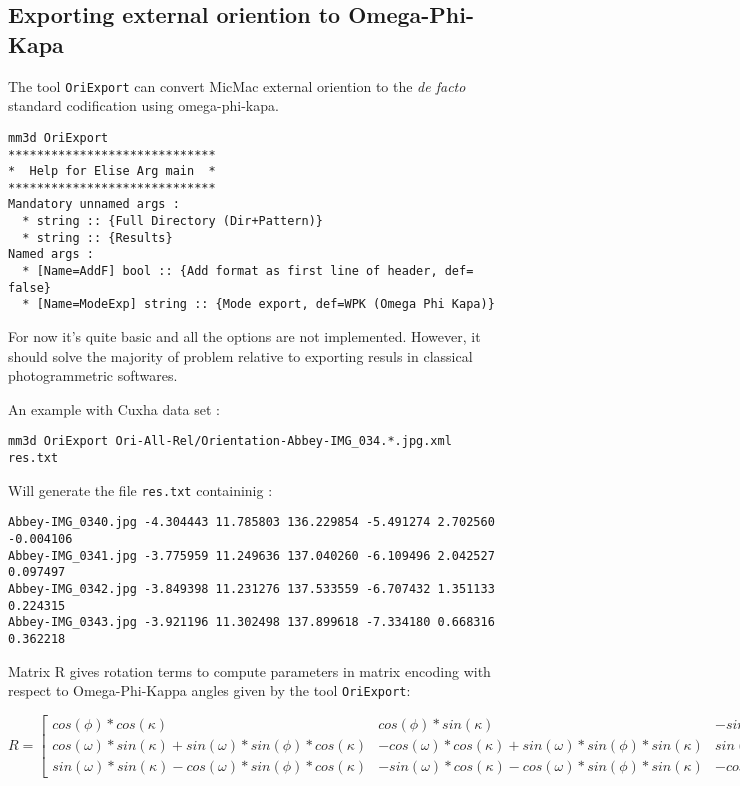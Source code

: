 \subsection{Exporting external oriention to Omega-Phi-Kapa}

The tool {\tt OriExport} can convert MicMac external oriention to the \emph{de facto} standard
codification using omega-phi-kapa.


\begin{verbatim}
mm3d OriExport
*****************************
*  Help for Elise Arg main  *
*****************************
Mandatory unnamed args :
  * string :: {Full Directory (Dir+Pattern)}
  * string :: {Results}
Named args :
  * [Name=AddF] bool :: {Add format as first line of header, def= false}
  * [Name=ModeExp] string :: {Mode export, def=WPK (Omega Phi Kapa)}
\end{verbatim}

For now it's quite basic and all the options are not implemented. However, it should solve the
majority of problem relative to exporting resuls in classical photogrammetric softwares.

An example with Cuxha data set :

\begin{verbatim}
mm3d OriExport Ori-All-Rel/Orientation-Abbey-IMG_034.*.jpg.xml  res.txt
\end{verbatim}

Will generate the file {\tt res.txt}  containinig :

\begin{verbatim}
Abbey-IMG_0340.jpg -4.304443 11.785803 136.229854 -5.491274 2.702560 -0.004106
Abbey-IMG_0341.jpg -3.775959 11.249636 137.040260 -6.109496 2.042527 0.097497
Abbey-IMG_0342.jpg -3.849398 11.231276 137.533559 -6.707432 1.351133 0.224315
Abbey-IMG_0343.jpg -3.921196 11.302498 137.899618 -7.334180 0.668316 0.362218
\end{verbatim}

Matrix R gives rotation terms to compute parameters in matrix encoding with respect to Omega-Phi-Kappa angles given by the tool {\tt OriExport}:
\newline


$R =
\begin{bmatrix}
    cos(\phi)*cos(\kappa) &  cos(\phi)*sin(\kappa) & -sin(\phi)\\
    cos(\omega)*sin(\kappa)+sin(\omega)*sin(\phi)*cos(\kappa) &  -cos(\omega)*cos(\kappa)+sin(\omega)*sin(\phi)*sin(\kappa) & sin(\omega)*cos(\phi)\\
    sin(\omega)*sin(\kappa)-cos(\omega)*sin(\phi)*cos(\kappa)  & -sin(\omega)*cos(\kappa)-cos(\omega)*sin(\phi)*sin(\kappa) & -cos(\omega)*cos(\phi)
\end{bmatrix}$
\newline



